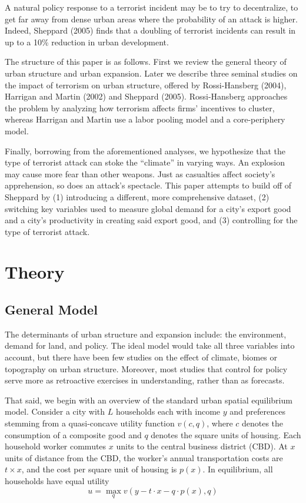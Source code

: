 \documentclass[preprint,2p,12pt]{elsarticle}
\begin{document}
A natural policy response to a terrorist incident may be to try to decentralize, to get far away from dense urban areas where the probability of an attack is higher. Indeed, Sheppard (2005) finds that a doubling of terrorist incidents can result in up to a 10\% reduction in urban development.

The structure of this paper is as follows. First we review the general theory of urban structure and urban expansion. Later we describe three seminal studies on the impact of terrorism on urban structure, offered by Rossi-Hansberg (2004), Harrigan and Martin (2002) and Sheppard (2005). Rossi-Hansberg approaches the problem by analyzing how terrorism affects firms' incentives to cluster, whereas Harrigan and Martin use a labor pooling model and a core-periphery model.

Finally, borrowing from the aforementioned analyses, we hypothesize that the type of terrorist attack can stoke the ``climate'' in varying ways. An explosion may cause more fear than other weapons. Just as casualties affect society's apprehension, so does an attack's spectacle. This paper attempts to build off of Sheppard by (1) introducing a different, more comprehensive dataset, (2) switching key variables used to measure global demand for a city's export good and a city's productivity in creating said export good, and (3) controlling for the type of terrorist attack.


\section{\sc Theory}

\subsection{\sc General Model}
The determinants of urban structure and expansion include: the environment, demand for land, and policy. The ideal model would take all three variables into account, but there have been few studies on the effect of climate, biomes or topography on urban structure. Moreover, most studies that control for policy serve more as retroactive exercises in understanding, rather than as forecasts.

That said, we begin with an overview of the standard urban spatial equilibrium model. Consider a city with $L$ households each with income $y$ and preferences stemming from a quasi-concave utility function $v(c,q)$, where $c$ denotes the consumption of a composite good and $q$ denotes the square units of housing. Each household worker commutes $x$ units to the central business district (CBD). At $x$ units of distance from the CBD, the worker's annual transportation costs are $t \times x$, and the cost per square unit of housing is $p(x)$. In equilibrium, all households have equal utility 
$$
u = \max_{q} v(y - t \cdot x - q \cdot p(x), q)
$$
  
\end{document}
